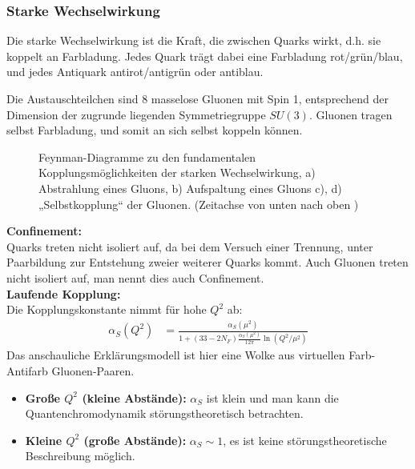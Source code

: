 \documentclass[final]{summery_5.0}
\begin{document}
\subsubsection{Starke Wechselwirkung}
Die starke Wechselwirkung ist die Kraft, die zwischen Quarks wirkt, d.h. sie koppelt an Farbladung.
Jedes Quark trägt dabei eine Farbladung rot/grün/blau, und jedes Antiquark antirot/antigrün oder antiblau.

Die Austauschteilchen sind 8 masselose Gluonen mit Spin 1, entsprechend der Dimension der zugrunde liegenden Symmetriegruppe $SU(3)$. Gluonen tragen selbst Farbladung, und somit an sich selbst koppeln können. 
\begin{figure}[H]
    \centering
    
    \caption{\small Feynman-Diagramme zu den fundamentalen Kopplungsmöglichkeiten der starken Wechselwirkung, a) Abstrahlung eines Gluons, b) Aufspaltung eines Gluons c), d) „Selbstkopplung“ der Gluonen. (Zeitachse von unten nach oben )}
\end{figure}


{\bf Confinement:}\\
Quarks treten nicht isoliert auf, da bei dem Versuch einer Trennung, unter Paarbildung zur Entstehung zweier weiterer Quarks kommt. Auch Gluonen treten nicht isoliert auf, man nennt dies auch Confinement.\\

{\bf Laufende Kopplung:}\\
Die Kopplungskonstante nimmt für hohe $Q^2$ ab:
\begin{align*}
    \alpha_S(Q^2) &= \frac{\alpha_S(\mu^2)}{1 + (33-2N_F) \frac{\alpha_S(\mu^2)}{12\pi} \ln(Q^2/\mu^2)}
\end{align*}
Das anschauliche Erklärungsmodell ist hier eine Wolke aus virtuellen Farb-Antifarb Gluonen-Paaren.
\begin{itemize}
    \item {\bf Große $Q^2$ (kleine Abstände):} $\alpha_S$ ist klein und man kann die Quantenchromodynamik störungstheoretisch betrachten.
    \item {\bf Kleine $Q^2$ (große Abstände):} $\alpha_S\sim1$, es ist keine störungstheoretische Beschreibung möglich.
\end{itemize}
\end{document}
